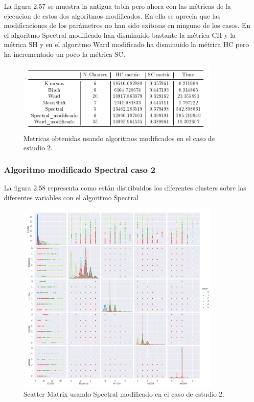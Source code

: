 	La figura 2.57 se muestra la antigua tabla pero ahora con las métricas de la ejecucion de estos dos algoritmos modificados.
	En ella se aprecia que las modificaciones de los parámetros no han sido exitosas en ninguno de los casos. 
	En el algoritmo Spectral modificado han disminuido bastante la métrica CH y la métrica SH 
	y en el algoritmo Ward modificado ha disminuido la métrica HC pero ha incrementado un poco la métrica SC. \\

	\begin{figure}[htb]
		\centering
		\includegraphics[width=0.9\textwidth]{./imagenes/caso2/algoritmos_modificados_caso2}
		\caption{Metricas obtenidas usando algoritmos modificados en el caso de estudio 2.} \label{fig:1}
	\end{figure}

	\subsubsection{Algoritmo modificado Spectral caso 2} 

	La figura 2.58 representa como están distribuidos los diferentes clusters sobre las diferentes variables con el 
	algoritmo Spectral\\

	\begin{figure}[htb]
		\centering
		\includegraphics[width=0.9\textwidth]{./imagenes/caso2/scatterMatrix_caso2_Spectral_modificado}
		\caption{Scatter Matrix usando Spectral modificado en el caso de estudio 2.} \label{fig:1}
	\end{figure}
	
